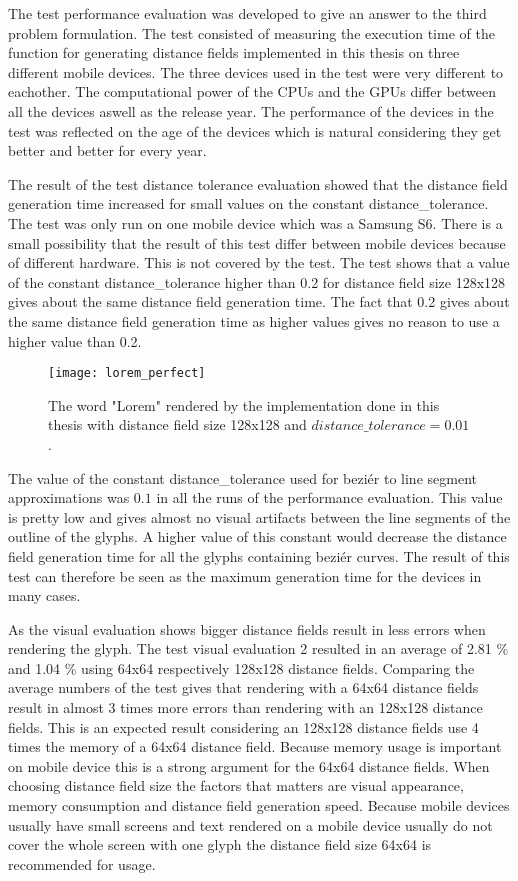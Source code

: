 The test performance evaluation was developed to give an answer to the third problem formulation. The test consisted of measuring the execution time of the function for generating distance fields implemented in this thesis on three different mobile devices. The three devices used in the test were very different to eachother. The computational power of the CPUs and the GPUs differ between all the devices aswell as the release year. The performance of the devices in the test was reflected on the age of the devices which is natural considering they get better and better for every year. 

The result of the test distance tolerance evaluation showed that the distance field generation time increased for small values on the constant distance\_tolerance. The test was only run on one mobile device which was a Samsung S6. There is a small possibility that the result of this test differ between mobile devices because of different hardware. This is not covered by the test. The test shows that a value of the constant distance\_tolerance higher than 0.2 for distance field size 128x128 gives about the same distance field generation time. The fact that 0.2 gives about the same distance field generation time as higher values gives no reason to use a higher value than 0.2.

\begin{figure}[H]
\texttt{[image: lorem\_perfect]}
\caption{The word "Lorem" rendered by the implementation done in this thesis with distance field size 128x128 and $distance\_tolerance=0.01$.}
\label{fig:isLine}
\end{figure}

The value of the constant distance\_tolerance used for beziér to line segment approximations was $0.1$ in all the runs of the performance evaluation. This value is pretty low and gives almost no visual artifacts between the line segments of the outline of the glyphs. A higher value of this constant would decrease the distance field generation time for all the glyphs containing beziér curves. The result of this test can therefore be seen as the maximum generation time for the devices in many cases.

As the visual evaluation shows bigger distance fields result in less errors when rendering the glyph. The test visual evaluation 2 resulted in an average of 2.81 \% and 1.04 \% using 64x64 respectively 128x128 distance fields. Comparing the average numbers of the test gives that rendering with a 64x64 distance fields result in almost 3 times more errors than rendering with an 128x128 distance fields. This is an expected result considering an 128x128 distance fields use 4 times the memory of a 64x64 distance field. Because memory usage is important on mobile device this is a strong argument for the 64x64 distance fields. When choosing distance field size the factors that matters are visual appearance, memory consumption and distance field generation speed. Because mobile devices usually have small screens and text rendered on a mobile device usually do not cover the whole screen with one glyph the distance field size 64x64 is recommended for usage.

